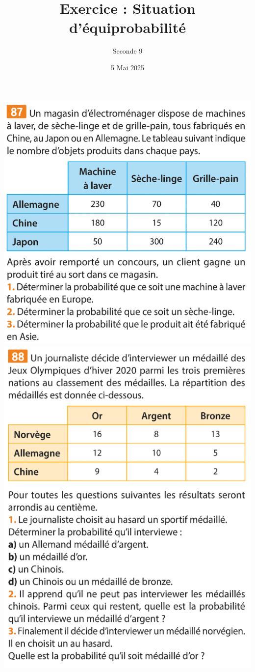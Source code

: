 \documentclass{article}
\title{Exercice : Situation d'équiprobabilité}
\date{5 Mai 2025}
\author{Seconde 9}
\begin{document}
\maketitle
\begin{center}
\begin{minipage}{0.45\textwidth}
\includegraphics[width=\textwidth]{Exercice_1.png}
\includegraphics[width=\textwidth]{Exercice_2.png}

\end{minipage}
\end{center}
\end{document}
